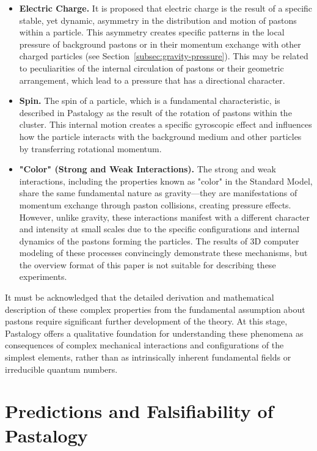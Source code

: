 \documentclass[pdflatex,sn-mathphys-num]{sn-jnl}
\begin{document}
\begin{itemize}
    \item \textbf{Electric Charge.} It is proposed that electric charge is the result of a specific stable, yet dynamic, asymmetry in the distribution and motion of pastons within a particle. This asymmetry creates specific patterns in the local pressure of background pastons or in their momentum exchange with other charged particles (see Section~\ref{subsec:gravity-pressure}). This may be related to peculiarities of the internal circulation of pastons or their geometric arrangement, which lead to a pressure that has a directional character.
    \item \textbf{Spin.} The spin of a particle, which is a fundamental characteristic, is described in Pastalogy as the result of the rotation of pastons within the cluster. This internal motion creates a specific gyroscopic effect and influences how the particle interacts with the background medium and other particles by transferring rotational momentum.
    \item \textbf{"Color" (Strong and Weak Interactions).} The strong and weak interactions, including the properties known as "color" in the Standard Model, share the same fundamental nature as gravity---they are manifestations of momentum exchange through paston collisions, creating pressure effects. However, unlike gravity, these interactions manifest with a different character and intensity at small scales due to the specific configurations and internal dynamics of the pastons forming the particles. The results of 3D computer modeling of these processes convincingly demonstrate these mechanisms, but the overview format of this paper is not suitable for describing these experiments.
\end{itemize}

It must be acknowledged that the detailed derivation and mathematical description of these complex properties from the fundamental assumption about pastons require significant further development of the theory. At this stage, Pastalogy offers a qualitative foundation for understanding these phenomena as consequences of complex mechanical interactions and configurations of the simplest elements, rather than as intrinsically inherent fundamental fields or irreducible quantum numbers.

\section{Predictions and Falsifiability of Pastalogy}\label{sec:predictions}
\end{document}
